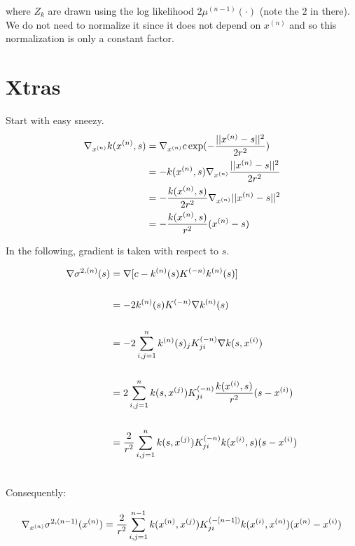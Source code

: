 where $Z_k$ are drawn using the log likelihood $2\mu^{(n-1)}(\cdot)$ (note the $2$ in there). We do not need to normalize it since it does not depend 
on $x^{(n)}$ and so this normalization is only a constant factor.


\section{Xtras}
Start with easy sneezy.
\begin{align}
 \begin{split}
  \gxn k(\xn,s) &= \gxn c\exp(-\frac{||\xn - s||^2}{2r^2} )\\
%
&= -k(\xn,s) \gxn\frac{||\xn - s||^2}{2r^2} \\
%
&= -\frac{k(\xn,s)}{2r^2} \gxn||\xn - s||^2 \\
%
&= -\frac{k(\xn ,s)}{r^2} (\xn-s)\\
 \end{split}
\end{align}

In the following, gradient is taken with respect to $s$.

\begin{align}
 \begin{split}
  \nabla \sqn (s) &= \nabla [ c - \kn(s) \Kinvn \kn(s)]\\\\
%
%
%
&= -2 \kn(s) \Kinvn \nabla\kn(s)\\\\
%
%
%
&= -2 \sum_{i,j=1}^{n} \kn(s)_j \Kinvn_{ji} \nabla k (s, \xii )\\\\
%
%
%
&= 2 \sum_{i,j=1}^{n} k(s,\xj) \Kinvn_{ji} \frac{k(\xii ,s)}{r^2} (s-\xii)\\\\
%
%
%
&= \frac{2}{r^2} \sum_{i,j=1}^{n} k(s,\xj) \Kinvn_{ji} k(\xii ,s) (s-\xii)\\\\
 \end{split}
\end{align}

Consequently:

\begin{align}
 \begin{split}
  \nabla_{x^{(n)}} \sigma^{2, (n-1)} (x^{(n)}) &= \frac{2}{r^2} \sum_{i,j=1}^{n-1} k(x^{(n)},x^{(j)}) K^{(-[n-1])}_{ji} k(x^{(i)} ,x^{(n)}) (x^{(n)}-x^{(i)})\\\\
 \end{split}
\end{align}




